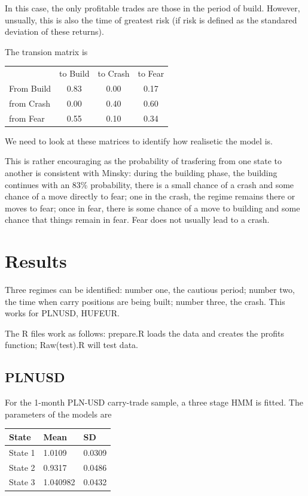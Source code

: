 \documentclass[12pt, a4paper, oneside]{article} %
\begin{document}
In this case, the only profitable trades are those in the period of build.  However, unsually, this is also the time of greatest risk (if risk is defined as the standared deviation of these returns).  

The transion matrix is 

 \begin{centering}
 \begin{tabular}{l c c c}
 & to Build & to Crash & to Fear\\
 From Build & 0.83 & 0.00 & 0.17\\
 from Crash & 0.00 & 0.40 & 0.60\\
 from Fear & 0.55 & 0.10 & 0.34
 \end{tabular}
 \end{centering}
 
We need to look at these matrices to identify how realisetic the model is. 

This is rather encouraging as the probability of trasfering from one state to another is consistent with Minsky:  during the building phase, the building continues with an 83\% probability, there is a small chance of a crash and some chance of a move directly to fear; one in the crash, the regime remains there or moves to fear; once in fear, there is some chance of a move to building and some chance that things remain in fear.  Fear does not usually lead to a crash. 


\section{Results}
Three regimes can be identified: number one, the cautious period; number two, the time when carry positions are being built; number three, the crash.  This works for PLNUSD, HUFEUR. 

The R files work as follows: prepare.R loads the data and creates the profits function; Raw(test).R will test data. 

\subsection{PLNUSD}
For the 1-month PLN-USD carry-trade sample, a three stage HMM is fitted.  The parameters of the models are 

\begin{tabular}{l | l l}
State & Mean & SD \\
\hline
State 1 & 1.0109 & 0.0309\\
State 2 & 0.9317 & 0.0486\\
State 3 & 1.040982 & 0.0432\\
\end{tabular}
\end{document}
